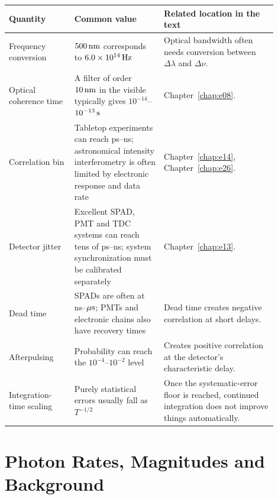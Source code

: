 \begin{longtable}{p{0.22\linewidth}p{0.30\linewidth}p{0.38\linewidth}}
\toprule
Quantity & Common value & Related location in the text \\
\midrule
Frequency conversion & \(500\,{\rm nm}\) corresponds to \(6.0\times10^{14}\,{\rm Hz}\) & Optical bandwidth often needs conversion between \(\Delta\lambda\) and \(\Delta\nu\). \\
Optical coherence time & A filter of order \(10\,{\rm nm}\) in the visible typically gives \(10^{-14}\)--\(10^{-13}\,{\rm s}\) & Chapter~\ref{chap:e08}. \\
Correlation bin & Tabletop experiments can reach ps--ns; astronomical intensity interferometry is often limited by electronic response and data rate & Chapter~\ref{chap:e14}, Chapter~\ref{chap:e26}. \\
Detector jitter & Excellent SPAD, PMT and TDC systems can reach tens of ps--ns; system synchronization must be calibrated separately & Chapter~\ref{chap:e13}. \\
Dead time & SPADs are often at ns--\(\mu{\rm s}\); PMTs and electronic chains also have recovery times & Dead time creates negative correlation at short delays. \\
Afterpulsing & Probability can reach the \(10^{-4}\)--\(10^{-2}\) level & Creates positive correlation at the detector's characteristic delay. \\
Integration-time scaling & Purely statistical errors usually fall as \(T^{-1/2}\) & Once the systematic-error floor is reached, continued integration does not improve things automatically. \\
\bottomrule
\end{longtable}

\section{Photon Rates, Magnitudes and Background}
\label{appsec:b-photon-rate}

